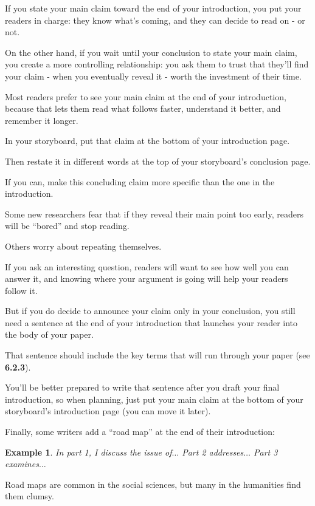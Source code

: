 \documentclass[oneside]{book}
\numberwithin{equation}{section}
\newtheorem{example}{Example}[section]
\begin{document}
If you state your main claim toward the end of your introduction, you put your readers in charge: they know what's coming, and they can decide to read on - or not.

On the other hand, if you wait until your conclusion to state your main claim, you create a more controlling relationship: you ask them to trust that they'll find your claim - when you eventually reveal it - worth the investment of their time.

Most readers prefer to see your main claim at the end of your introduction, because that lets them read what follows faster, understand it better, and remember it longer.

In your storyboard, put that claim at the bottom of your introduction page.

Then restate it in different words at the top of your storyboard's conclusion page.

If you can, make this concluding claim more specific than the one in the introduction.

%
Some new researchers fear that if they reveal their main point too early, readers will be ``bored'' and stop reading.

Others worry about repeating themselves.


If you ask an interesting question, readers will want to see how well you can answer it, and knowing where your argument is going will help your readers follow it.

%
But if you do decide to announce your claim only in your conclusion, you still need a sentence at the end of your introduction that launches your reader into the body of your paper.

That sentence should include the key terms that will run through your paper (see \textbf{6.2.3}).

You'll be better prepared to write that sentence after you draft your final introduction, so when planning, just put your main claim at the bottom of your storyboard's introduction page (you can move it later).

%
Finally, some writers add a ``road map'' at the end of their introduction:
\begin{example}
    In part 1, I discuss the issue of$\ldots$ Part 2 addresses$\ldots$ Part 3 examines$\ldots$
\end{example}
Road maps are common in the social sciences, but many in the humanities find them clumsy.
\end{document}
